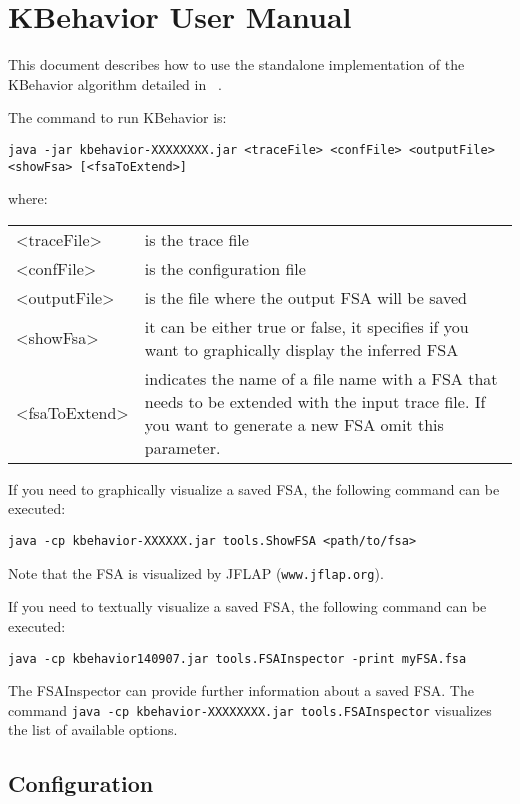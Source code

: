 \chapter{KBehavior User Manual}

This document describes how to use the standalone implementation of the KBehavior algorithm detailed in ~\cite{Mariani:BCT:TSE:2011}.

The command to run KBehavior is:

\texttt{java -jar kbehavior-XXXXXXXX.jar  <traceFile> <confFile>
<outputFile> <showFsa> [<fsaToExtend>]}




where:

\begin{tabular}{p{3cm}|p{10cm}}
<traceFile>& is the trace file\\
<confFile>& is the configuration file\\
<outputFile>& is the file where the output FSA will be saved\\
<showFsa>& it can be either true or false, it specifies if you want to graphically display the inferred FSA\\
<fsaToExtend>& indicates the name of a file name with a FSA that needs to be extended with the input trace file. If you want to generate a new FSA omit this parameter.\\
\end{tabular}

\vspace{5mm}

If you need to graphically visualize a saved FSA, the following
command can be executed:

\begin{verbatim}
java -cp kbehavior-XXXXXX.jar tools.ShowFSA <path/to/fsa>
\end{verbatim}
Note that the FSA is visualized by JFLAP (\texttt{www.jflap.org}).


If you need to textually visualize a saved FSA, the following
command can be executed:

\begin{verbatim}
java -cp kbehavior140907.jar tools.FSAInspector -print myFSA.fsa
\end{verbatim}

The FSAInspector can provide further information about a saved FSA.
The command \texttt{java -cp kbehavior-XXXXXXXX.jar
tools.FSAInspector} visualizes the list of available options.


\section{Configuration}

